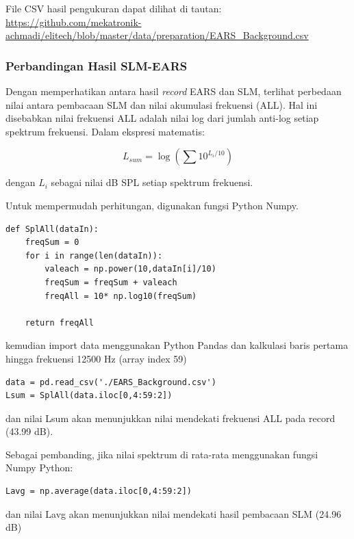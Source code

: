 \documentclass[12pt,]{article}
\begin{document}
	File CSV hasil pengukuran dapat dilihat di tautan:
	\url{https://github.com/mekatronik-achmadi/elitech/blob/master/data/preparation/EARS_Background.csv}
	
	\subsubsection{Perbandingan Hasil SLM-EARS}
	
	Dengan memperhatikan antara hasil \textit{record} EARS dan SLM,
	terlihat perbedaan nilai antara pembacaan SLM dan nilai akumulasi frekuensi (ALL).
	Hal ini disebabkan nilai frekuensi ALL adalah nilai log dari jumlah anti-log setiap spektrum frekuensi.
	Dalam ekspresi matematis:
	
	\[L_{sum} = \log (\sum 10^{L_i/10}) \]
	
	dengan \(L_i\) sebagai nilai dB SPL setiap spektrum frekuensi.
	
	Untuk mempermudah perhitungan, digunakan fungsi Python Numpy.
	
	\begin{verbatim}
def SplAll(dataIn):
	freqSum = 0
	for i in range(len(dataIn)):
		valeach = np.power(10,dataIn[i]/10)
		freqSum = freqSum + valeach
		freqAll = 10* np.log10(freqSum)
	
	return freqAll
	\end{verbatim}

	kemudian import data menggunakan Python Pandas dan kalkulasi baris pertama hingga frekuensi 12500 Hz (array index 59)
	
	\begin{verbatim}
data = pd.read_csv('./EARS_Background.csv')
Lsum = SplAll(data.iloc[0,4:59:2])
	\end{verbatim}

	dan nilai Lsum akan menunjukkan nilai mendekati frekuensi ALL pada record (43.99 dB).
	
	\newpage
	Sebagai pembanding, jika nilai spektrum di rata-rata menggunakan fungsi Numpy Python:
	
	\begin{verbatim}
Lavg = np.average(data.iloc[0,4:59:2])
	\end{verbatim}

	dan nilai Lavg akan menunjukkan nilai mendekati hasil pembacaan SLM (24.96 dB)
	
\end{document}
